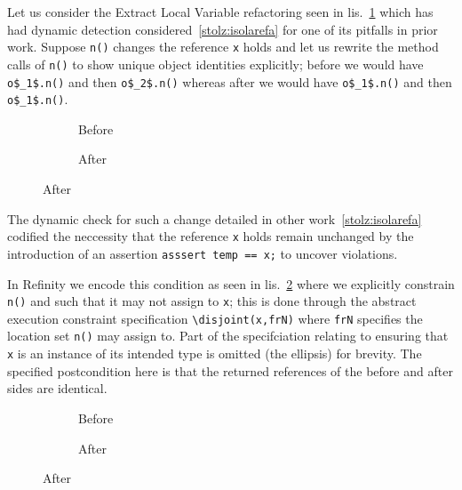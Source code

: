 Let us consider the Extract Local Variable refactoring seen in lis.~\ref{lst:ExtractVariable-java} which has had dynamic detection
considered~\ref{stolz:isolarefa} for one of its pitfalls in prior work. Suppose \lstinline[style=smallJava]|n()| changes the reference
\lstinline[style=smallJava]|x| holds and let us rewrite the method calls of \lstinline[style=smallJava]|n()| to show unique
object identities explicitly; before we would have \lstinline[mathescape=true,style=smallJava]|o$_1$.n()| and then
\lstinline[mathescape=true,style=smallJava]|o$_2$.n()| whereas after we would have \lstinline[mathescape=true,style=smallJava]|o$_1$.n()|
and then \lstinline[mathescape=true,style=smallJava]|o$_1$.n()|.


\begin{figure}[!htb]
  \centering
  \begin{subfigure}{.2\linewidth}
    
    \caption{Before}
  \end{subfigure}\hspace{1cm}
  \begin{subfigure}{.3\linewidth}
    
    \caption{After}
  \end{subfigure}
\label{lst:ExtractVariable-java}
\end{figure}

The dynamic check for such a change detailed in other work~\ref{stolz:isolarefa} codified the neccessity that the reference \lstinline[style=smallJava]|x|
holds remain unchanged by the introduction of an assertion \lstinline[style=smallJava]|asssert temp == x;| to uncover violations.

In Refinity we encode this condition as seen in lis.~\ref{lst:ExtractVariable-refinity} where we explicitly constrain \lstinline[style=refinity]|n()| and
such that it may not assign to \lstinline[style=refinity]|x|; this is done through the abstract execution constraint specification \lstinline[style=refinity]|\disjoint(x,frN)|
where \lstinline[style=refinity]|frN| specifies the location set \lstinline[style=refinity]|n()| may assign to. Part of the specifciation relating to
ensuring that \lstinline[style=refinity]|x| is an instance of its intended type is omitted (the ellipsis) for brevity. The specified postcondition here is that the
returned references of the before and after sides are identical.

\begin{figure}[!htb]
  \centering
  \begin{subfigure}{.4\linewidth}
    
    \caption{Before}
  \end{subfigure}\hspace{1cm}
  \begin{subfigure}{.4\linewidth}
    
    \caption{After}
  \end{subfigure}
\label{lst:ExtractVariable-refinity}
\end{figure}

